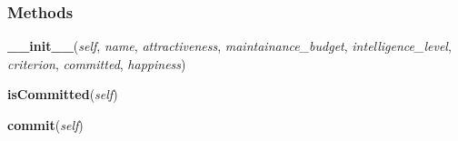 
  \subsubsection{Methods}

    \label{girl:Girl:__init__}

    \vspace{0.5ex}

\hspace{.8\funcindent}\begin{boxedminipage}{\funcwidth}

    \raggedright \textbf{\_\_init\_\_}(\textit{self}, \textit{name}, \textit{attractiveness}, \textit{maintainance\_budget}, \textit{intelligence\_level}, \textit{criterion}, \textit{committed}, \textit{happiness})

\setlength{\parskip}{2ex}
\setlength{\parskip}{1ex}
    \end{boxedminipage}

    \label{girl:Girl:isCommitted}

    \vspace{0.5ex}

\hspace{.8\funcindent}\begin{boxedminipage}{\funcwidth}

    \raggedright \textbf{isCommitted}(\textit{self})

\setlength{\parskip}{2ex}
\setlength{\parskip}{1ex}
    \end{boxedminipage}

    \label{girl:Girl:commit}

    \vspace{0.5ex}

\hspace{.8\funcindent}\begin{boxedminipage}{\funcwidth}

    \raggedright \textbf{commit}(\textit{self})

\setlength{\parskip}{2ex}
\setlength{\parskip}{1ex}
    \end{boxedminipage}

